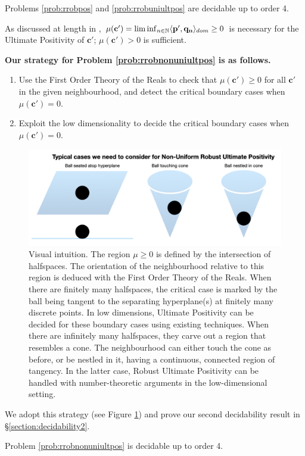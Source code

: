 \begin{theorem}
\label{thm:decide}
Problems \ref{prob:rrobpos} and \ref{prob:rrobuniultpos} are decidable up to order 4.
\end{theorem}

As discussed at length in \cite{originalstacs,originalarxiv}, $\mu(\mathbf{c'})= \liminf_{n \in \mathbb{N}} \langle\mathbf{p'}, \mathbf{q_n}\rangle_{dom} \ge 0$ is necessary for the Ultimate Positivity of $\mathbf{c'}$; $\mu(\mathbf{c'}) > 0$ is sufficient.

\textbf{Our strategy for Problem \ref{prob:rrobnonuniultpos} is as follows.}
\begin{enumerate}
\item Use the First Order Theory of the Reals to check that $\mu(\mathbf{c'}) \ge 0$ for all $\mathbf{c'}$ in the given neighbourhood, and detect the critical boundary cases when $\mu(\mathbf{c'}) = 0$.
\item Exploit the low dimensionality to decide the critical boundary cases when $\mu(\mathbf{c'}) = 0$.
\end{enumerate}

\begin{figure}[h]

\includegraphics[width=\textwidth]{picture1.png}
\caption{Visual intuition. The region $\mu \ge 0$ is defined by the intersection of halfspaces. The orientation of the neighbourhood relative to this region is deduced with the First Order Theory of the Reals. When there are finitely many halfspaces, the critical case is marked by the ball being tangent to the separating hyperplane(s) at finitely many discrete points. In low dimensions, Ultimate Positivity can be decided for these boundary cases using existing techniques. When there are infinitely many halfspaces, they carve out a region that resembles a cone. The neighbourhood can either touch the cone as before, or be nestled in it, having a continuous, connected region of tangency. In the latter case, Robust Ultimate Positivity can be handled with number-theoretic arguments in the low-dimensional setting.}
\label{fig:geometricpicture}
\end{figure}

We adopt this strategy (see Figure \ref{fig:geometricpicture}) and prove our second decidability result in \S\ref{section:decidability2}.
\begin{theorem}
\label{thm:decide2}
Problem \ref{prob:rrobnonuniultpos} is decidable up to order 4.
\end{theorem}




